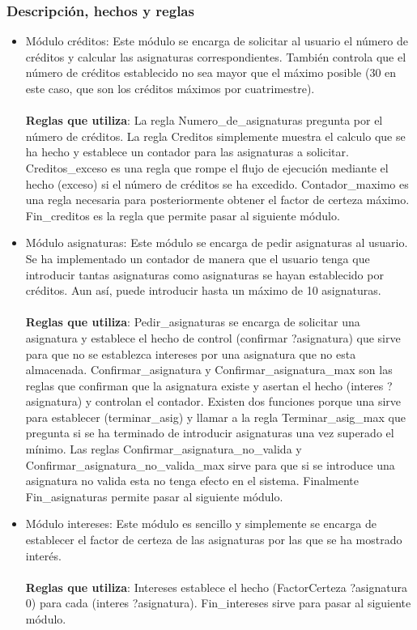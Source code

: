 \subsubsection{Descripción, hechos y reglas}
\begin{itemize}
   \item Módulo créditos: Este módulo se encarga de solicitar al usuario el número de créditos y calcular las asignaturas correspondientes. También controla que el número de créditos establecido no sea mayor que el máximo posible (30 en este caso, que son los créditos máximos por cuatrimestre).
   \\\\
   \textbf{Reglas que utiliza}: La regla Numero\_de\_asignaturas pregunta por el número de créditos. La regla Creditos simplemente muestra el calculo que se ha hecho y establece un contador para las asignaturas a solicitar. Creditos\_exceso es una regla que rompe el flujo de ejecución mediante el hecho (exceso) si el número de créditos se ha excedido. Contador\_maximo es una regla necesaria para posteriormente obtener el factor de certeza máximo. Fin\_creditos es la regla que permite pasar al siguiente módulo.

   \item Módulo asignaturas: Este módulo se encarga de pedir asignaturas al usuario. Se ha implementado un contador de manera que el usuario tenga que introducir tantas asignaturas como asignaturas se hayan establecido por créditos. Aun así, puede introducir hasta un máximo de 10 asignaturas.
   \\\\
   \textbf{Reglas que utiliza}: Pedir\_asignaturas se encarga de solicitar una asignatura y establece el hecho de control (confirmar ?asignatura) que sirve para que no se establezca intereses por una asignatura que no esta almacenada. Confirmar\_asignatura y Confirmar\_asignatura\_max son las reglas que confirman que la asignatura existe y asertan el hecho (interes ?asignatura) y controlan el contador. Existen dos funciones porque una sirve para establecer (terminar\_asig) y llamar a la regla Terminar\_asig\_max que pregunta si se ha terminado de introducir asignaturas una vez superado el mínimo. Las reglas Confirmar\_asignatura\_no\_valida y Confirmar\_asignatura\_no\_valida\_max sirve  para que si se introduce una asignatura no valida esta no tenga efecto en el sistema. Finalmente Fin\_asignaturas permite pasar al siguiente módulo.

   \item Módulo intereses: Este módulo es sencillo y simplemente se encarga de establecer el factor de certeza de las asignaturas por las que se ha mostrado interés.
   \\\\
   \textbf{Reglas que utiliza}: Intereses establece el hecho (FactorCerteza ?asignatura 0) para cada (interes ?asignatura). Fin\_intereses sirve para pasar al siguiente módulo.


\end{itemize}
